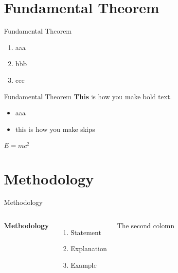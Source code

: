\documentclass[9pt]{beamer}
\begin{document}
\section{Fundamental Theorem}
\begin{frame}{Fundamental Theorem}
\begin{enumerate}
    \item aaa
    \item bbb
    \item ccc
\end{enumerate}
    
\end{frame}

\begin{frame}{Fundamental Theorem}
  \textbf{This} is how you make bold text.
  \medskip

  \begin{itemize}
      \item aaa
      \medskip
      \item this is how you make skips
  \end{itemize}    
  \medskip

  \begin{theorem}
    $E = mc^2$
  \end{theorem}

\end{frame}

\section{Methodology}
\begin{frame}{Methodology}
  \begin{columns}[c] %

      \textbf{Methodology}
      \begin{enumerate}
        \item Statement
        \item Explanation
        \item Example
      \end{enumerate}

      The second colomn

  \end{columns}
\end{frame}
\end{document}
